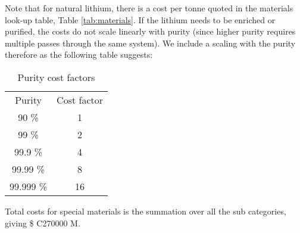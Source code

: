 Note that for natural lithium, there is a cost per tonne quoted in the materials look-up table, Table \ref{tab:materials}.  If the lithium needs to be enriched or purified, the costs do not scale linearly with purity (since higher purity requires multiple passes through the same system).  We include a scaling with the purity therefore as the following table suggests:

\begin{table}[]
    \centering
    \begin{tabular}{c|c}
       Purity  &  Cost factor \\
       90 \%  &  1 \\
       99 \%  &  2 \\
       99.9 \%  &  4 \\
       99.99 \%  &  8 \\
       99.999 \%  &  16 \\
    \end{tabular}
    \caption{Purity cost factors}
    \label{tab:my_label}
\end{table}

Total costs for special materials is the summation over all the sub categories, giving \$ C270000 M.  



